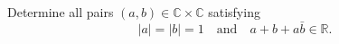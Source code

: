 Determine all pairs \((a, b) \in \mathbb{C} \times \mathbb{C}\) satisfying
\[
|a| = |b| = 1 \quad \text{and} \quad a + b + a\bar{b} \in \mathbb{R}.
\]
